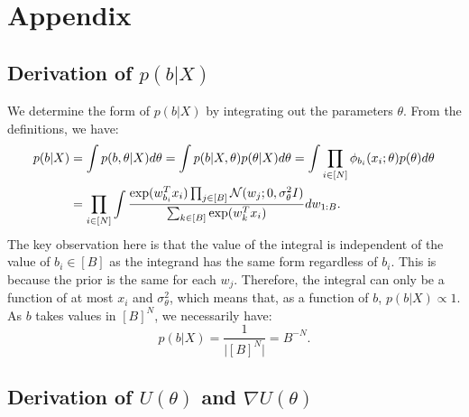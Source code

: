 \section{Appendix}

\subsection{Derivation of {\boldmath $p(b|X)$}}
\label{appdx:b|x}

We determine the form of $p(b| X)$ by integrating
out the parameters $\theta$. From the definitions, we have:
%
\begin{align*}
	p(b | X) 
	&= \int p(b , \theta| X) d\theta 
	= \int p(b | X, \theta) p(\theta | X) d\theta
	= \int \prod_{i \in [N] } \phi_{b_i}(x_i; \theta) p(\theta) d\theta \\
	&= \prod_{i \in [N]} \int \frac{\exp(w_{b_i}^T x_i) \prod_{j \in [B]} \mathcal{N}(w_j; 0, \sigma_\theta^2 I)}{\sum_{k \in [B]} \exp(w_{k}^T x_i)} dw_{1:B}.
\end{align*}
%
The key observation here is that 
the value of the integral is independent
of the value of $b_i \in [B]$ as
the integrand has the same form regardless of $b_i$. This is
because the prior is the same for each $w_j$. 
Therefore, the integral can only be a function of at most $x_i$ and $\sigma_\theta^2$,
which means that, as a function of $b$, $p(b|X)\propto 1$. As
$b$ takes values in $[B]^N$, we necessarily have:
%
\begin{equation}
	p(b | X) = \frac{1}{\big|[B]^N\big|}=B^{-N}.
\end{equation}

\subsection{Derivation of {\boldmath $U(\theta)$} and {\boldmath $\nabla U(\theta)$}}
\label{appdx:form-U}

